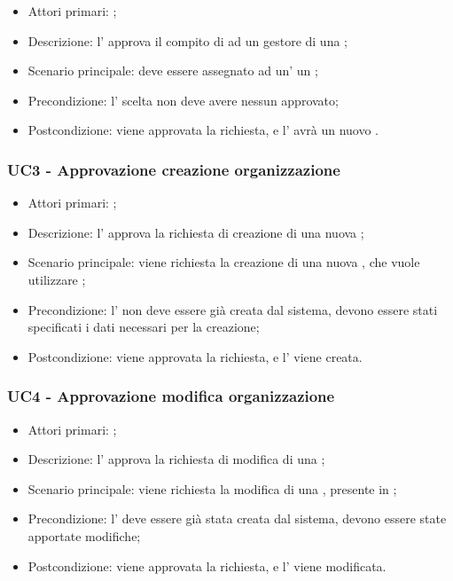 \documentclass[../analisi-dei-requisiti]{subfiles}
\begin{document}
\begin{itemize}
\item Attori primari: ;
\item Descrizione: l' approva il compito di  ad un gestore di una ;
\item Scenario principale: deve essere assegnato ad un' un ;
\item Precondizione: l' scelta non deve avere nessun  approvato;
\item Postcondizione: viene approvata la richiesta, e l' avrà un nuovo .

\end{itemize}
\subsubsection{UC3 - Approvazione creazione organizzazione}
\label{subsub:UC3}

\begin{itemize}
\item Attori primari: ;
\item Descrizione: l' approva la richiesta di creazione di una nuova ;
\item Scenario principale: viene richiesta la creazione di una nuova , che vuole utilizzare ;
\item Precondizione: l' non deve essere già creata dal sistema, devono essere stati specificati i dati necessari per la creazione;
\item Postcondizione: viene approvata la richiesta, e l' viene creata.

\end{itemize}
\subsubsection{UC4 - Approvazione modifica organizzazione}
\label{subsub:UC4}

\begin{itemize}
\item Attori primari: ;
\item Descrizione: l' approva la richiesta di modifica di una ;
\item Scenario principale: viene richiesta la modifica di una , presente in ;
\item Precondizione: l' deve essere già stata creata dal sistema, devono essere state apportate modifiche;
\item Postcondizione: viene approvata la richiesta, e l' viene modificata.

\end{itemize}
\end{document}
